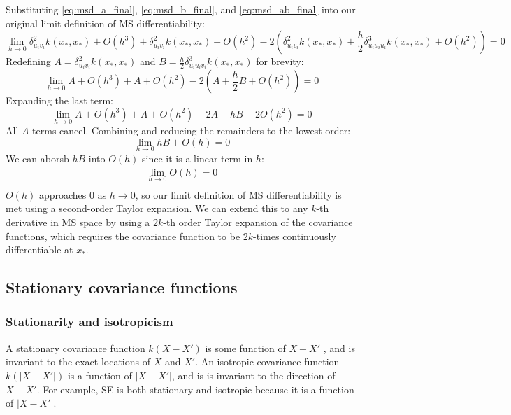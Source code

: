 Substituting \ref{eq:msd_a_final}, \ref{eq:msd_b_final}, and \ref{eq:msd_ab_final} into our original limit definition of MS differentiability:
\begin{equation*}
    \lim_{h \to 0} \delta_{u_i v_i}^2 k(x_*, x_*) + O(h^3) + \delta_{u_i v_i}^2 k(x_*, x_*) + O(h^2) - 2 \left( \delta_{u_i v_i}^2 k(x_*, x_*) + \frac{h}{2} \delta_{u_i u_i u_i}^3 k(x_*, x_*) + O(h^2) \right) = 0 
\end{equation*}
Redefining $A = \delta_{u_i v_i}^2 k(x_*, x_*)$ and $B = \frac{h}{2} \delta_{u_i u_i v_i}^3 k(x_*, x_*)$ for brevity:
\begin{equation*}
    \lim_{h \to 0} A + O(h^3) + A + O(h^2) - 2(A + \frac{h}{2}B + O(h^2)) = 0
\end{equation*}
Expanding the last term:
\begin{equation*}
    \lim_{h \to 0} A + O(h^3) + A + O(h^2) - 2A - hB - 2O(h^2) = 0
\end{equation*}
All $A$ terms cancel. Combining and reducing the remainders to the lowest order:
\begin{equation*}
    \lim_{h \to 0} hB + O(h) = 0
\end{equation*}
We can aborsb $hB$ into $O(h)$ since it is a linear term in $h$:
\begin{equation} \label{eq:ms_differentiability}
    \begin{aligned}
        \lim_{h \to 0} O(h) = 0 \\
    \end{aligned}
\end{equation}
$O(h)$ approaches $0$ as $h \to 0$, so our limit definition of MS differentiability is met using a second-order Taylor expansion. We can extend this to any $k$-th derivative in MS space by using a $2k$-th order Taylor expansion of the covariance functions, which requires the covariance function to be $2k$-times continuously differentiable at $x_*$.

\subsection{Stationary covariance functions \cite{gp-ml}}

\subsubsection{Stationarity and isotropicism}
A stationary covariance function $k(X - X')$ is some function of $X - X'$ , and is invariant to the exact locations of $X$ and $X'$. An isotropic covariance function $k(|X - X'|)$ is a function of $|X - X'|$, and is is invariant to the direction of $X - X'$. For example, SE \cite{eq:se} is both stationary and isotropic because it is a function of $|X - X'|$.

